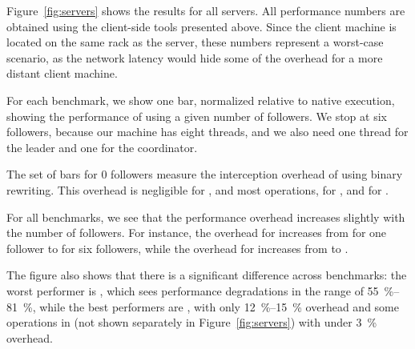Figure~\ref{fig:servers} shows the results for all servers. All
performance numbers are obtained using the client-side tools presented
above.  Since the client machine is located on the same rack as the
server, these numbers represent a worst-case scenario, as the network
latency would hide some of the overhead for a more distant client
machine.


For each benchmark, we show one bar, normalized relative to native
execution, showing the performance of \varan using a given number of
followers.  We stop at six followers, because our machine has eight
threads, and we also need one thread for the leader and one for the
coordinator.  

The set of bars for 0 followers measure the interception overhead
of \varan using binary rewriting.  This overhead is negligible for
\lighttpd, \memcached and most \redis operations, \nginxIntercept for \nginx,
and \beanstalkdIntercept for \beanstalkd.

For all benchmarks, we see that the performance overhead increases
slightly with the number of followers.  For instance, the overhead for
\beanstalkd increases from \beanstalkdOneFollower for one follower to
\beanstalkdSixFollowers for six followers, while the overhead for
\lighttpd increases from \lighttpdOneFollower to
\lighttpdSixFollowers.

The figure also shows that there is a significant difference across
benchmarks: the worst performer is \beanstalkd, which sees performance
degradations in the range of \SIrange{55}{81}{\percent}, while the best performers are
\lighttpd, with only \SIrange{12}{15}{\percent} overhead and some operations in \redis
(not shown separately in Figure~\ref{fig:servers})
with under \SI{3}{\percent} overhead.

